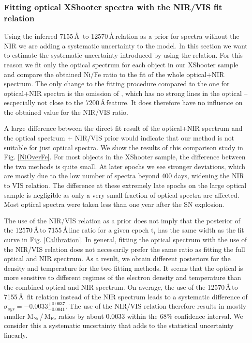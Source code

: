 \documentclass[fleqn,usenatbib]{mnras}
\begin{document}
\subsubsection{Fitting optical XShooter spectra with the NIR/VIS fit relation}
\label{TestNIRVIS_relation}
Using the inferred  7155\,\AA\, to 12570\,\AA\,relation as a prior for spectra without the NIR we are adding a systematic uncertainty to the model. In this section we want to estimate the systematic uncertainty introduced by using the relation. For this reason we fit only the optical spectrum for each object in our XShooter sample and compare the obtained Ni/Fe ratio to the fit of the whole optical+NIR spectrum. The only change to the fitting procedure compared to the one for optical+NIR spectra is the omission of , which has no strong lines in the optical -- escpecially not close to the 7200\,\AA\,feature. It does therefore have no influence on the obtained value for the NIR/VIS ratio.

A large difference between the direct fit result of the optical+NIR spectrum and the optical spectrum + NIR/VIS prior would indicate that our method is not suitable for just optical spectra. We show the results of this comparison study in Fig. \ref{NiOverFe}. For most objects in the XShooter sample, the difference between the two methods is quite small. At later epochs we see stronger deviations, which are mostly due to the low number of spectra beyond 400 days, widening the NIR to VIS relation. The difference at these extremely late epochs on the large optical sample is negligible as only a very small fraction of optical spectra are affected. Most optical spectra were taken less than one year after the SN explosion. 

The use of the NIR/VIS relation as a prior does not imply that the posterior of the 12570\,\AA\,to 7155\,\AA\,line ratio for a given epoch t$_i$ has the same width as the fit curve in Fig. \ref{Calibration}. In general, fitting the optical spectrum with the use of the NIR/VIS relation does not necessarily prefer the same ratio as fitting the full optical and NIR spectrum. As a result, we obtain different posteriors for the density and temperature for the two fitting methods. It seems that the optical is more sensitive to different regimes of the electron density and temperature than the combined optical and NIR spectrum. On average, the use of the  12570\,\AA\,to 7155\,\AA\, fit relation instead of the NIR spectrum leads to a systematic difference of $\sigma_{sys}=-0.0033^{+0.0037}_{-0.0041}$. The use of the NIR/VIS relation therefore results in mostly smaller M$_\text{Ni}$\,/\,M$_\text{Fe}$ ratios by about 0.0033 within the 68\% confidence interval. We consider this a systematic uncertainty that adds to the statistical uncertainty linearly.
\end{document}
